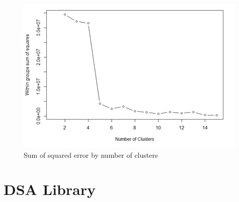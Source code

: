 \begin{figure}[H]
    \centering
    \includegraphics[width=0.8\linewidth]{Chapters/img/elbow_method.png}
    \caption{Sum of squared error by number of clusters}
    \label{fig:elbow_method}
\end{figure}






\section{DSA Library} %
\label{sub:dsa_library}


